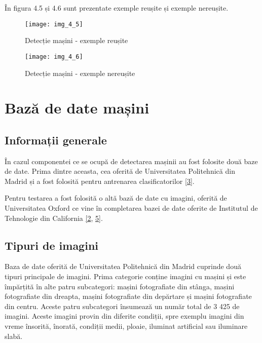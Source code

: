 În figura 4.5 și 4.6 sunt prezentate exemple reușite și exemple nereușite. 

\begin{figure}[!h]
	\centering
	\texttt{[image: img\_4\_5]}
	\caption{Detecție mașini - exemple reușite}
\end{figure}
\begin{figure}[!ht]
	\centering
	\texttt{[image: img\_4\_6]}
	\caption{Detecție mașini - exemple nereușite}
\end{figure}

\section{Bază de date mașini}

\subsection*{Informații generale}

În cazul componentei ce se ocupă de detectarea mașinii au fost folosite două baze de date. Prima dintre aceasta, cea oferită de Universitatea Politehnică din Madrid și a fost folosită pentru antrenarea clasificatorilor \hyperlink{BazadedatemasiniUniversitateaPolitehnicadinMadrid}{[3]}.

Pentru testarea a fost folosită o altă bază de date cu imagini, oferită de Universitatea Oxford ce vine în completarea bazei de date oferite de Institutul de Tehnologie din California \hyperlink{BazadedatemasiniUniversitateaOxford}{[2}, \hyperlink{BazadedatemasiniInstituluideTehnologiedinCalifornia}{5]}.

\subsection*{Tipuri de imagini}

Baza de date oferită de Universitatea Politehnică din Madrid cuprinde două tipuri principale de imagini. Prima categorie conține imagini cu mașini și este împărțită în alte patru subcategori: mașini fotografiate din stânga, mașini fotografiate din dreapta, mașini fotografiate din depărtare și mașini fotografiate din centru. Aceste patru subcategori însumează un număr total de 3 425 de imagini. Aceste imagini provin din diferite condiții, spre exemplu imagini din vreme însorită, înorată, condiții medii, ploaie, iluminat artificial sau iluminare slabă.

